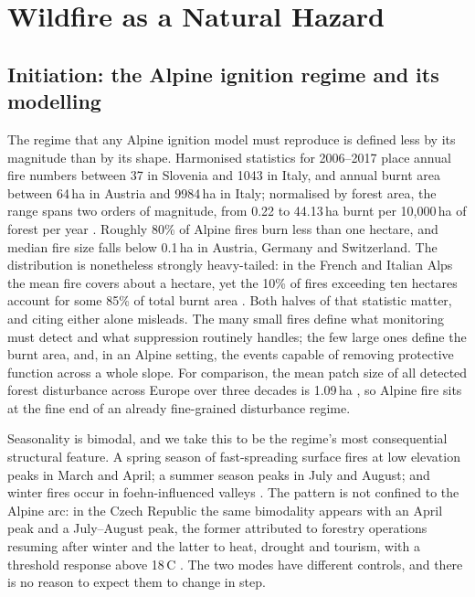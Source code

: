 \documentclass[11pt,a4paper]{article}
\begin{document}
\section{Wildfire as a Natural Hazard}
\label{sec:hazard}

\subsection{Initiation: the Alpine ignition regime and its modelling}

The regime that any Alpine ignition model must reproduce is defined less by its magnitude than by its shape. Harmonised statistics for 2006--2017 place annual fire numbers between 37 in Slovenia and 1043 in Italy, and annual burnt area between 64\,ha in Austria and 9984\,ha in Italy; normalised by forest area, the range spans two orders of magnitude, from 0.22 to 44.13\,ha burnt per 10{,}000\,ha of forest per year \citep{muller_forest_2020}. Roughly 80\% of Alpine fires burn less than one hectare, and median fire size falls below 0.1\,ha in Austria, Germany and Switzerland. The distribution is nonetheless strongly heavy-tailed: in the French and Italian Alps the mean fire covers about a hectare, yet the 10\% of fires exceeding ten hectares account for some 85\% of total burnt area \citep{muller_forest_2020}. Both halves of that statistic matter, and citing either alone misleads. The many small fires define what monitoring must detect and what suppression routinely handles; the few large ones define the burnt area, and, in an Alpine setting, the events capable of removing protective function across a whole slope. For comparison, the mean patch size of all detected forest disturbance across Europe over three decades is 1.09\,ha \citep{senf_mapping_2021}, so Alpine fire sits at the fine end of an already fine-grained disturbance regime.

Seasonality is bimodal, and we take this to be the regime's most consequential structural feature. A spring season of fast-spreading surface fires at low elevation peaks in March and April; a summer season peaks in July and August; and winter fires occur in foehn-influenced valleys \citep{valese_wildfires_2011, muller_forest_2020}. The pattern is not confined to the Alpine arc: in the Czech Republic the same bimodality appears with an April peak and a July--August peak, the former attributed to forestry operations resuming after winter and the latter to heat, drought and tourism, with a threshold response above 18\,\degree C \citep{bercak_combination_2024}. The two modes have different controls, and there is no reason to expect them to change in step.
\end{document}
